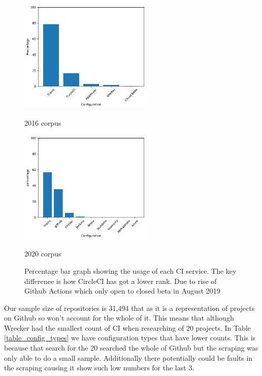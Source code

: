 \documentclass[10pt,conference]{IEEEtran}
\begin{document}
\begin{figure}[!htbp]
  \centering
  \begin{minipage}{.48\textwidth}
    \centering
    \includegraphics[width=2.5in]{../src/results/comparison_config_bar.pdf}
    \caption[]{2016 corpus}
    \label{graph:config_bar2016}
  \end{minipage}
  \begin{minipage}{.48\textwidth}
    \centering
  \includegraphics[width=2.5in]{../src/results/config-topn.pdf}
  \caption[]{2020 corpus}
  \label{graph:config_bar2020}
  \end{minipage}
  \caption[]{Percentage bar graph showing the usage of each CI service. The key difference is how CircleCI has got a lower rank. Due to rise of Github Actions which only open to closed beta in August 2019}
  \label{graph:config_bars}

\end{figure}

Our sample size of repositories is 31,494 that as it is a representation of projects on Github so won't account for the whole of it. This means that although Wrecker had the smallest count of CI when researching of 20 projects. In Table \ref{table_config_types} we have configuration types that have lower counts. This is because that search for the 20 searched the whole of Github but the scraping was only able to do a small sample. Additionally there potentially could be faults in the scraping causing it show such low numbers for the last 3. 
\end{document}
